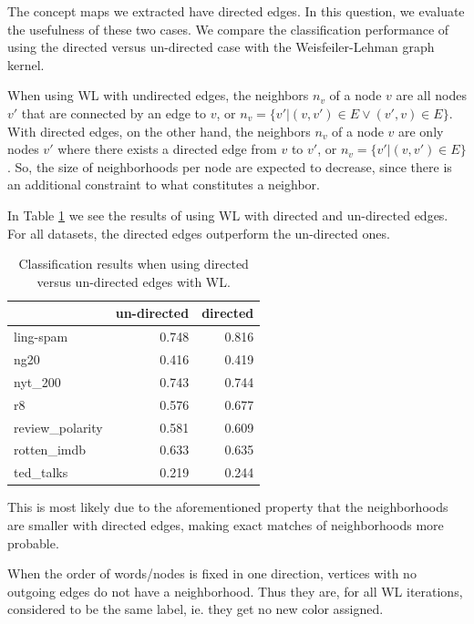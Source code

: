 The concept maps we extracted have directed edges.
In this question, we evaluate the usefulness of these two cases.
We compare the classification performance of using the directed versus un-directed case with the Weisfeiler-Lehman graph kernel.

When using WL with undirected edges, the neighbors $n_v$ of a node $v$ are all nodes $v'$ that are connected by an edge to $v$, or $n_v = \{v' | (v, v') \in E \lor (v', v ) \in E \}$.
With directed edges, on the other hand, the neighbors $n_v$ of a node $v$ are only nodes $v'$ where there exists a directed edge from $v$ to $v'$, or $n_v = \{v' | (v, v') \in E \}$.
So, the size of neighborhoods per node are expected to decrease, since there is an additional constraint to what constitutes a neighbor.

In Table \ref{table:results_directed_vs_undirected} we see the results of using WL with directed and un-directed edges.
For all datasets, the directed edges outperform the un-directed ones.

\begin{table}[htb!]
	\centering
\begin{tabular}{lrr}
	 &  un-directed & directed \\
	\midrule
ling-spam       & 0.748 & 0.816 \\
ng20            & 0.416 & 0.419 \\
nyt\_200         & 0.743 & 0.744 \\
r8              & 0.576 & 0.677 \\
review\_polarity & 0.581 & 0.609 \\
rotten\_imdb     & 0.633 & 0.635 \\
ted\_talks       & 0.219 & 0.244 \\
	\bottomrule
\end{tabular}
\caption[Results: WL with directed and un-directed edges]{Classification results when using directed versus un-directed edges with WL.}\label{table:results_directed_vs_undirected}
\end{table}

This is most likely due to the aforementioned property that the neighborhoods are smaller with directed edges, making exact matches of neighborhoods more probable.

When the order of words/nodes is fixed in one direction, vertices with no outgoing edges do not have a neighborhood. Thus they are, for all WL iterations, considered to be the same label, ie. they get no new color assigned.

